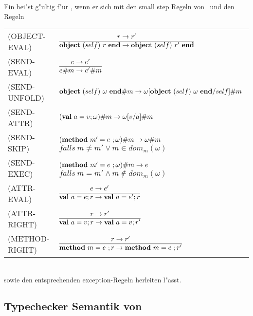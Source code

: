 Ein  hei"st g"ultig f"ur \LTWOO, wenn er sich mit den small step Regeln von \LTWO\ und den Regeln\\[5mm]
  \begin{tabular}{ll}
    \mbox{(OBJECT-EVAL)}    & $\regel{r \to r'}
                                     {\object{self}{r} \to \object{self}{r'}}$ \\[5mm]
    \mbox{(SEND-EVAL)}      & $\regel{e \to e'}
                                     {\send{e}{m} \to \send{e'}{m}}$ \\[5mm]
    \mbox{(SEND-UNFOLD)}    & $\textbf{object}\ (self)\ \omega\ \textbf{end} \# m \to 
                               \omega [\textbf{object}\ (self)\ \omega\ \textbf{end}/self] \# m$ \\[3mm]
    \mbox{(SEND-ATTR)}      & $(\textbf{val}\ a=v;\omega) \# m \to \omega [v/a] \# m$ \\[3mm]
    \mbox{(SEND-SKIP)}      & $(\textbf{method}\ m'=e\ ;\omega) \# m \to \omega \# m$ \ 
                              $falls\ m \neq m' \vee m \in dom_m(\omega)$ \\[3mm]
    \mbox{(SEND-EXEC)}      & $(\textbf{method}\ m'=e\ ;\omega) \# m \to e$ \ 
                              $falls\ m = m' \wedge m \notin dom_m(\omega)$ \\[3mm]
    \mbox{(ATTR-EVAL)}      & $\regel{e \to e'}
                                     {\attr{a}{e}r \to \attr{a}{e'}r}$ \\[5mm]
    \mbox{(ATTR-RIGHT)}     & $\regel{r \to r'}
                                     {\attr{a}{v}r \to \attr{a}{v}r'}$ \\[5mm]
    \mbox{(METHOD-RIGHT)}   & $\regel{r \to r'}
                                     {\method{m}{e}r \to \method{m}{e}r'}$
  \end{tabular}\\[7mm]
sowie den entsprechenden exception-Regeln herleiten l"asst.


\subsection{Typechecker Semantik von \LTWOO}

